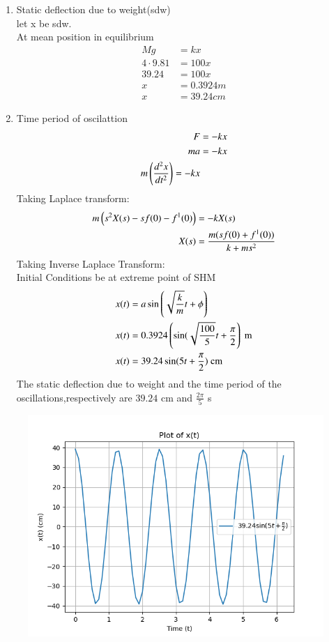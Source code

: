 \documentclass[journal,12pt,twocolumn]{IEEEtran}
\theoremstyle{remark}
\begin{document}
\begin{enumerate}
    \item Static deflection due to weight(sdw)\\
    let x be sdw.\\
    At mean position in equilibrium\\
    \begin{align}
        Mg&=kx\\
        4\cdot9.81&=100x\\
        39.24&=100x\\
        x&=0.3924m\\
        x&=39.24cm
    \end{align}
     \item Time period of oscilattion\\
     \begin{align}
           F&=-kx\\
           ma&=-kx\\
           m\left(\frac{d^2x}{dt^2}\right)=-kx
     \end{align}
     Taking Laplace transform:
     \begin{align}
       m\left(s^2X(s)-sf(0)-f^1(0)\right)&=-kX(s)\\
       X(s)&=\frac{m(sf(0)+f^1(0))}{k+ms^2}
     \end{align}
     Taking Inverse Laplace Transform:\\
     Initial Conditions be at extreme point of SHM
     \begin{align}
      x(t)&=a\sin\left(\sqrt{\frac{k}{m}} t+\phi\right)\\
      x(t)&=0.3924\left(\sin(\sqrt{\frac{100}{5}}t+\frac{\pi}{2}\right)\text{ m}\\
      x(t)&=39.24 \sin(5t+\frac{\pi}{2}) \text{ cm}
     \end{align}
    The static deflection due to weight and the time period of the oscillations,respectively are $39.24$ cm and $\frac{2\pi}{5}$ s
\end{enumerate}
\begin{figure}[h!]
    \centering
    \includegraphics[width = \columnwidth]{figs/xe_71_f2.png}
\end{figure}
\end{document}
